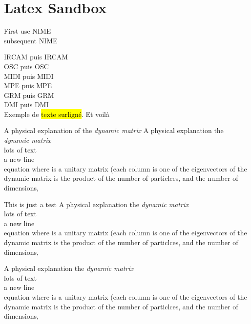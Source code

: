 %
\chapter{Latex Sandbox}
\label{ch:latex_sandbox}

First use \gls{NIME}\\
subsequent \gls{NIME}

\gls{IRCAM} puis \gls{IRCAM}\\
\gls{OSC} puis \gls{OSC}\\
\gls{MIDI} puis \gls{MIDI}\\
\gls{MPE} puis \gls{MPE}\\
\gls{GRM} puis \gls{GRM}\\
\gls{DMI} puis \gls{DMI}\\


Exemple de \hl{texte surligné}. Et voilà


\begin{titlebox}{A physical explanation of the \emph{dynamic matrix}}
A physical explanation the \emph{dynamic matrix}\\
lots of text\\
a new line\\
equation
where  is a unitary matrix (each column is one of the eigenvectors of the dynamic matrix is the product of the number of particlces, and the number of dimensions,
\end{titlebox}

\begin{notebox}{This is just a test}
A physical explanation the \emph{dynamic matrix}\\
lots of text\\
a new line\\
equation
where  is a unitary matrix (each column is one of the eigenvectors of the dynamic matrix is the product of the number of particlces, and the number of dimensions,
\end{notebox}

\begin{notebox}
A physical explanation the \emph{dynamic matrix}\\
lots of text\\
a new line\\
equation
where  is a unitary matrix (each column is one of the eigenvectors of the dynamic matrix is the product of the number of particlces, and the number of dimensions,
\end{notebox}